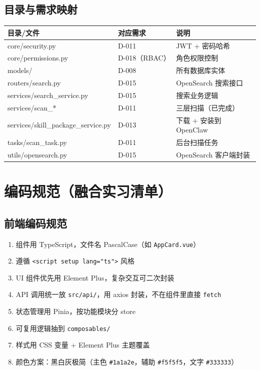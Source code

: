 \documentclass[11pt,a4paper]{article}
\begin{document}
\subsection{目录与需求映射}

\begin{table}[h]
\centering
\begin{tabularx}{\linewidth}{llX}
\toprule
\textbf{目录/文件} & \textbf{对应需求} & \textbf{说明} \\
\midrule
core/security.py & D-011 & JWT + 密码哈希 \\
core/permissions.py & D-018（RBAC） & 角色权限控制 \\
models/ & D-008 & 所有数据库实体 \\
routers/search.py & D-015 & OpenSearch 搜索接口 \\
services/search\_service.py & D-015 & 搜索业务逻辑 \\
services/scan\_* & D-011 & 三层扫描（已完成） \\
services/skill\_package\_service.py & D-013 & 下载 + 安装到 OpenClaw \\
tasks/scan\_task.py & D-011 & 后台扫描任务 \\
utils/opensearch.py & D-015 & OpenSearch 客户端封装 \\
\bottomrule
\end{tabularx}
\end{table}

\section{编码规范（融合实习清单）}

\subsection{前端编码规范}

\begin{enumerate}[nosep]
  \item 组件用 TypeScript，文件名 PascalCase（如 \texttt{AppCard.vue}）
  \item 遵循 \texttt{<script setup lang="ts">} 风格
  \item UI 组件优先用 Element Plus，复杂交互可二次封装
  \item API 调用统一放 \texttt{src/api/}，用 axios 封装，不在组件里直接 \texttt{fetch}
  \item 状态管理用 Pinia，按功能模块分 store
  \item 可复用逻辑抽到 \texttt{composables/}
  \item 样式用 CSS 变量 + Element Plus 主题覆盖
  \item 颜色方案：黑白灰极简（主色 \texttt{\#1a1a2e}，辅助 \texttt{\#f5f5f5}，文字 \texttt{\#333333}）
\end{enumerate}
\end{document}
